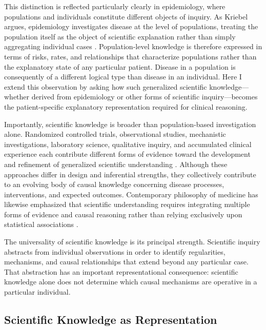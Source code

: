 \documentclass[11pt]{article}
\begin{document}
This distinction is reflected particularly clearly in epidemiology, where populations and individuals constitute different objects of inquiry. As Kriebel argues, epidemiology investigates disease at the level of populations, treating the population itself as the object of scientific explanation rather than simply aggregating individual cases \parencite{kriebel_response_2008}. Population-level knowledge is therefore expressed in terms of risks, rates, and relationships that characterize populations rather than the explanatory state of any particular patient. Disease in a population is consequently of a different logical type than disease in an individual. Here I extend this observation by asking how such generalized scientific knowledge—whether derived from epidemiology or other forms of scientific inquiry—becomes the patient-specific explanatory representation required for clinical reasoning. 

Importantly, scientific knowledge is broader than population-based investigation alone. Randomized controlled trials, observational studies, mechanistic investigations, laboratory science, qualitative inquiry, and accumulated clinical experience each contribute different forms of evidence toward the development and refinement of generalized scientific understanding \parencite{collins_synthesis_2018,collins_dynamic_2014}. Although these approaches differ in design and inferential strengths, they collectively contribute to an evolving body of causal knowledge concerning disease processes, interventions, and expected outcomes. Contemporary philosophy of medicine has likewise emphasized that scientific understanding requires integrating multiple forms of evidence and causal reasoning rather than relying exclusively upon statistical associations \parencite{anjum2020rethinking}.

The universality of scientific knowledge is its principal strength. Scientific inquiry abstracts from individual observations in order to identify regularities, mechanisms, and causal relationships that extend beyond any particular case. That abstraction has an important representational consequence: scientific knowledge alone does not determine which causal mechanisms are operative in a particular individual.

\subsection{Scientific Knowledge as Representation}
\end{document}
